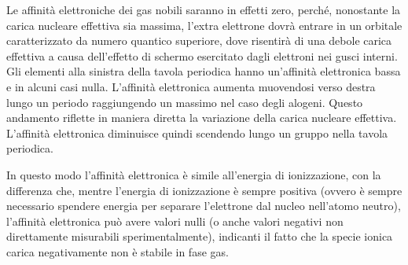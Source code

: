 Le affinità elettroniche dei gas nobili saranno in effetti zero, perché, nonostante la carica nucleare effettiva sia massima, l'extra elettrone dovrà entrare in un orbitale caratterizzato da numero quantico superiore, dove risentirà di una debole carica effettiva a causa dell'effetto di schermo esercitato dagli elettroni nei gusci interni. Gli elementi alla sinistra della tavola periodica hanno un'affinità elettronica bassa e in alcuni casi nulla. L'affinità elettronica aumenta muovendosi verso destra lungo un periodo raggiungendo un massimo nel caso degli alogeni. Questo andamento riflette in maniera diretta la variazione della carica nucleare effettiva. L'affinità elettronica diminuisce quindi scendendo lungo un gruppo nella tavola periodica. 

In questo modo l'affinità elettronica è simile all'energia di ionizzazione, con la differenza che, mentre l'energia di ionizzazione è sempre positiva (ovvero è sempre necessario spendere energia per separare l'elettrone dal nucleo nell'atomo neutro), l'affinità elettronica può avere valori nulli (o anche valori negativi non direttamente misurabili sperimentalmente), indicanti il fatto che la specie ionica carica negativamente non è stabile in fase gas.
